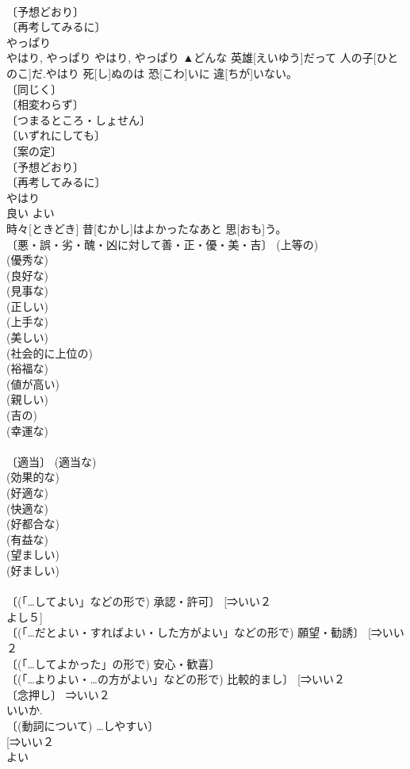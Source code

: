 \documentclass[8pt]{extreport}
\begin{document}
\begin{CJK}{UTF8}{min}
\\	〔予想どおり〕 
\\	〔再考してみるに〕 
\\	やっぱり	
\\	やはり, やっぱり	やはり, やっぱり	▲どんな 英雄[えいゆう]だって 人の子[ひとのこ]だ.やはり 死[し]ぬのは 恐[こわ]いに 違[ちが]いない。	
\\	〔同じく〕 
\\	〔相変わらず〕 
\\	〔つまるところ・しょせん〕 
\\	〔いずれにしても〕 
\\	〔案の定〕 
\\	〔予想どおり〕 
\\	〔再考してみるに〕 
\\	やはり	
\\	良い	よい	
\\	時々[ときどき] 昔[むかし]はよかったなあと 思[おも]う。	
\\	〔悪・誤・劣・醜・凶に対して善・正・優・美・吉〕 (上等の) 
\\	(優秀な) 
\\	(良好な) 
\\	(見事な) 
\\	(正しい) 
\\	(上手な) 
\\	(美しい) 
\\	(社会的に上位の) 
\\	(裕福な) 
\\	(値が高い) 
\\	(親しい) 
\\	(吉の) 
\\	(幸運な) 
\\	[⇒いい２, よからぬ, よき, よかれ] 
\\	〔適当〕 (適当な) 
\\	(効果的な) 
\\	(好適な) 
\\	(快適な) 
\\	(好都合な) 
\\	(有益な) 
\\	(望ましい) 
\\	(好ましい) 
\\	[⇒いい２ 
\\	〔(「…でよい」 「よかったら」などの形で) 許容・満足〕 [⇒いい２ 
\\	よし５, よろしい] 
\\	〔(「…してよい」などの形で) 承認・許可〕 [⇒いい２ 
\\	よし５] 
\\	〔(「…だとよい・すればよい・した方がよい」などの形で) 願望・勧誘〕 [⇒いい２ 
\\	〔(「…してよかった」の形で) 安心・歓喜〕 
\\	〔(「…よりよい・…の方がよい」などの形で) 比較的まし〕 [⇒いい２ 
\\	〔念押し〕 ⇒いい２ 
\\	いいか. 
\\	〔(動詞について) …しやすい〕 
\\	[⇒いい２ 
\\	よい	
\end{CJK}
\end{document}
